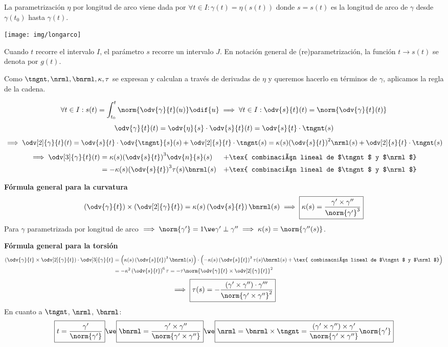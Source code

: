 La parametrización $\eta$ por longitud de arco viene dada por $\forall t \in I : \gamma(t) = \eta(s(t))$ donde $s=s(t)$ es la longitud de arco de $\gamma$ desde $\gamma(t_0)$ hasta $\gamma(t)$.
\begin{center}
	\texttt{[image: img/longarco]}
\end{center}
Cuando $t$ recorre el intervalo $I$, el parámetro $s$ recorre un intervalo $J$. En notación general de (re)parametrización, la función $t \to s(t)$ se denota por $g(t)$.

Como $\tngnt, \nrml, \bnrml, \kappa, \tau$ se expresan y calculan a través de derivadas de $\eta$ y queremos hacerlo en términos de $\gamma$, aplicamos la regla de la cadena.

\[\forall t \in I : s(t) = \int_{t_0}^t \norm{\odv{\gamma}{t}(u)}\odif{u} \implies \forall t \in I : \odv{s}{t}(t)=\norm{\odv{\gamma}{t}(t)}\]
\[\odv{\gamma}{t}(t)=\odv{\eta}{s}\cdot\odv{s}{t}(t)=\odv{s}{t}\cdot\tngnt(s)\]
\[\implies \odv[2]{\gamma}{t} (t) = \odv{s}{t}\cdot\odv{\tngnt}{s}(s) + \odv[2]{s}{t}\cdot\tngnt(s) = \kappa(s) {\left(\odv{s}{t}\right)}^2\nrml(s) + \odv[2]{s}{t}\cdot\tngnt(s)\]
\[\begin{aligned}
		\implies \odv[3]{\gamma}{t}(t) & = \kappa(s){\left(\odv{s}{t}\right)}^3\odv{n}{s}(s)      & + \tex{ combinación lineal de $\tngnt$ y $\nrml$} \\
		                               & = - \kappa(s){\left(\odv{s}{t}\right)}^3\tau(s)\bnrml(s) & + \tex{ combinación lineal de $\tngnt$ y $\nrml$}
	\end{aligned}\]

\textbf{Fórmula general para la curvatura}
\[\left(\odv{\gamma}{t}\right)\times\left(\odv[2]{\gamma}{t}\right)=\kappa(s)\left(\odv{s}{t}\right)\bnrml(s) \implies \boxed{\kappa(s)=\frac{\gamma'\times \gamma''}{\norm{\gamma'}^3}}\]
Para $\gamma$ parametrizada por longitud de arco $\implies \norm{\gamma'}=1 \we \gamma'\perp\gamma'' \implies \kappa(s)=\norm{\gamma''(s)}$.

\textbf{Fórmula general para la torsión}
\[\begin{aligned}
		\left(\odv{\gamma}{t}\times\odv[2]{\gamma}{t}\right) \cdot \odv[3]{\gamma}{t} & = \left(\kappa(s)\left(\odv{s}{t}\right)^3\bnrml(s)\right)\cdot\left(-\kappa(s)\left(\odv{s}{t}\right)^3\tau(s)\bnrml(s) + \tex{ combinacnión lineal de $\tngnt$ y $\nrml$}\right) \\
		                                                                              & = - \kappa^2\left(\odv{s}{t}\right)^6\tau=-\tau\norm{\odv{\gamma}{t}\times\odv[2]{\gamma}{t}}^2
	\end{aligned}\]
\[\implies \boxed{\tau(s)=-\frac{(\gamma'\times\gamma'')\cdot\gamma'''}{\norm{\gamma'\times\gamma''}^2}}\]
En cuanto a $\tngnt$, $\nrml$, $\bnrml$:
\[\boxed{t=\frac{\gamma'}{\norm{\gamma'}}} \we \boxed{\bnrml=\frac{\gamma'\times\gamma''}{\norm{\gamma'\times\gamma''}}} \we \boxed{\nrml=\bnrml\times\tngnt=\frac{\left(\gamma'\times\gamma''\right)\times\gamma'}{\norm{\gamma'\times\gamma''}}\norm{\gamma'}}\]

